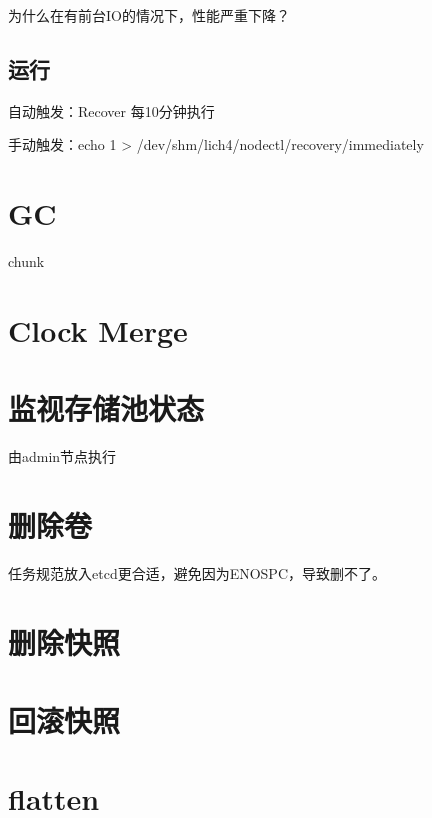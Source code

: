为什么在有前台IO的情况下，性能严重下降？

\subsection{运行}

\begin{tcolorbox}
    自动触发：Recover 每10分钟执行

    手动触发：echo 1 > /dev/shm/lich4/nodectl/recovery/immediately
\end{tcolorbox}

\section{GC}

chunk

\section{Clock Merge}

\section{监视存储池状态}

由admin节点执行

\section{删除卷}

任务规范放入etcd更合适，避免因为ENOSPC，导致删不了。

\section{删除快照}

\section{回滚快照}

\section{flatten}




